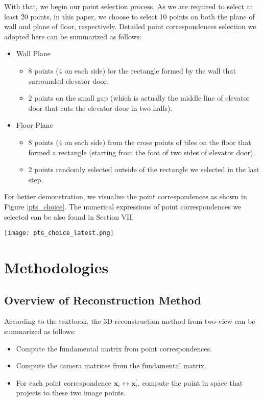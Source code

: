 \documentclass[conference]{IEEEtran}
\newcommand{\mat}[1]{\mathbf{#1}} %
\begin{document}
With that, we begin our point selection process. As we are required to select at least 20 points, in this paper, we choose to select 10 points on both the plane of wall and plane of floor, respectively. Detailed point correspondences selection we adopted here can be summarized as follows:
\begin{itemize}
	\item Wall Plane
		\begin{itemize}
			\item 8 points (4 on each side) for the rectangle formed by the wall that surrounded elevator door.
			\item 2 points on the small gap (which is actually the middle line of elevator door that cuts the elevator door in two halfs).
		\end{itemize}
	\item Floor Plane
		\begin{itemize}
			\item 8 points (4 on each side) from the cross points of tiles on the floor that formed a rectangle (starting from the foot of two sides of elevator door).
			\item 2 points randomly selected outside of the rectangle we selected in the last step.
		\end{itemize}
\end{itemize}
For better demonstration, we visualize the point correspondences as shown in Figure \ref{pts_choice}. The numerical expressions of point correspondences we selected can be also found in Section VII.

\begin{figure*}[hbpt]
  \centering \texttt{[image: pts\_choice\_latest.png]}
  \caption{Visualizing Point Correspondences Selected for 3D Reconstruction}
  \label{pts_choice}
\end{figure*}

\section{Methodologies}
\subsection{Overview of Reconstruction Method}
According to the textbook, the 3D reconstruction method from two-view can be summarized as follows:
\begin{itemize}
	\item Compute the fundamental matrix from point correspondences.
	\item Compute the camera matrices from the fundamental matrix.
	\item For each point correspondence $\mat{x}_i\leftrightarrow \mat{x}_i^\prime$, compute the point in space that projects to these two image points.
\end{itemize}
\end{document}
